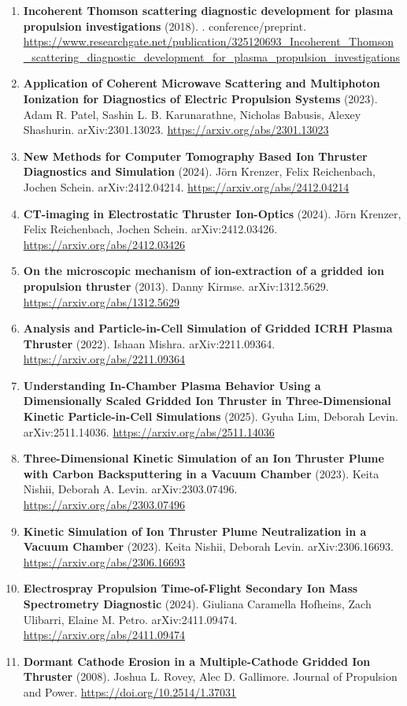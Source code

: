 \documentclass[11pt,a4paper]{article}
\begin{document}
\begin{enumerate}[leftmargin=1.4em]
\item \textbf{Incoherent Thomson scattering diagnostic development for plasma propulsion investigations} (2018). . conference/preprint. \url{https://www.researchgate.net/publication/325120693_Incoherent_Thomson_scattering_diagnostic_development_for_plasma_propulsion_investigations}
\item \textbf{Application of Coherent Microwave Scattering and Multiphoton Ionization for Diagnostics of Electric Propulsion Systems} (2023). Adam R. Patel, Sashin L. B. Karunarathne, Nicholas Babusis, Alexey Shashurin. arXiv:2301.13023. \url{https://arxiv.org/abs/2301.13023}
\item \textbf{New Methods for Computer Tomography Based Ion Thruster Diagnostics and Simulation} (2024). Jörn Krenzer, Felix Reichenbach, Jochen Schein. arXiv:2412.04214. \url{https://arxiv.org/abs/2412.04214}
\item \textbf{CT-imaging in Electrostatic Thruster Ion-Optics} (2024). Jörn Krenzer, Felix Reichenbach, Jochen Schein. arXiv:2412.03426. \url{https://arxiv.org/abs/2412.03426}
\item \textbf{On the microscopic mechanism of ion-extraction of a gridded ion propulsion thruster} (2013). Danny Kirmse. arXiv:1312.5629. \url{https://arxiv.org/abs/1312.5629}
\item \textbf{Analysis and Particle-in-Cell Simulation of Gridded ICRH Plasma Thruster} (2022). Ishaan Mishra. arXiv:2211.09364. \url{https://arxiv.org/abs/2211.09364}
\item \textbf{Understanding In-Chamber Plasma Behavior Using a Dimensionally Scaled Gridded Ion Thruster in Three-Dimensional Kinetic Particle-in-Cell Simulations} (2025). Gyuha Lim, Deborah Levin. arXiv:2511.14036. \url{https://arxiv.org/abs/2511.14036}
\item \textbf{Three-Dimensional Kinetic Simulation of an Ion Thruster Plume with Carbon Backsputtering in a Vacuum Chamber} (2023). Keita Nishii, Deborah A. Levin. arXiv:2303.07496. \url{https://arxiv.org/abs/2303.07496}
\item \textbf{Kinetic Simulation of Ion Thruster Plume Neutralization in a Vacuum Chamber} (2023). Keita Nishii, Deborah Levin. arXiv:2306.16693. \url{https://arxiv.org/abs/2306.16693}
\item \textbf{Electrospray Propulsion Time-of-Flight Secondary Ion Mass Spectrometry Diagnostic} (2024). Giuliana Caramella Hofheins, Zach Ulibarri, Elaine M. Petro. arXiv:2411.09474. \url{https://arxiv.org/abs/2411.09474}
\item \textbf{Dormant Cathode Erosion in a Multiple-Cathode Gridded Ion Thruster} (2008). Joshua L. Rovey, Alec D. Gallimore. Journal of Propulsion and Power. \url{https://doi.org/10.2514/1.37031}

\end{enumerate}
\end{document}
